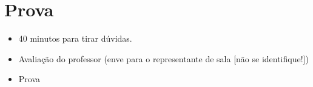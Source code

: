 \section{Prova}

\begin{frame}
	\begin{block}{}
		\begin{itemize}
			\item 40 minutos para tirar dúvidas.
			\item Avaliação do professor (enve para o representante de sala [não se identifique!])
			\item Prova
		\end{itemize}
	\end{block}
\end{frame}
